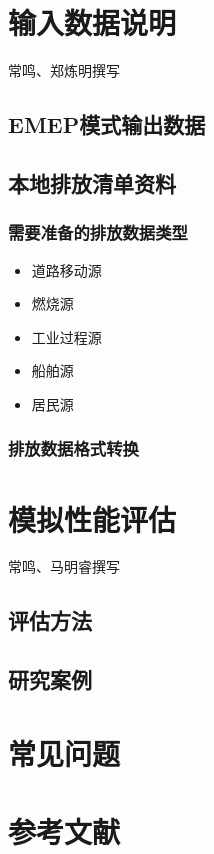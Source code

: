 \documentclass{article}
\begin{document}
\section{输入数据说明}

{\color{red} 常鸣、郑炼明撰写}

\subsection{EMEP模式输出数据}

\subsection{本地排放清单资料}

\subsubsection{需要准备的排放数据类型}

\begin{itemize}

\item 道路移动源

\item 燃烧源

\item 工业过程源

\item 船舶源

\item 居民源

\end{itemize}

\subsubsection{排放数据格式转换}

\section{模拟性能评估}

{\color{red} 常鸣、马明睿撰写}

\subsection{评估方法}

\subsection{研究案例}

\section{常见问题}

\section{参考文献}

\end{document}
